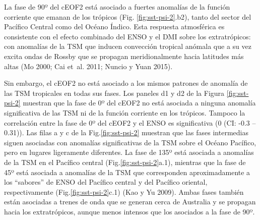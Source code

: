 \documentclass[12pt,oneside,a4paper]{reedthesis}
\begin{document}
La fase de 90º del cEOF2 está asociado a fuertes anomalías de la función corriente que emanan de los trópicos (Fig. \ref{fig:sst-psi-2}.b2), tanto del sector del Pacífico Central como del Océano Índico.
Esta respuesta atmosférica es consistente con el efecto combinado del ENSO y el DMI sobre los extratrópicos: con anomalías de la TSM que inducen convección tropical anómala que a su vez excita ondas de Rossby que se propagan meridionalmente hacia latitudes más altas (Mo 2000; Cai et~al. 2011; Nuncio y Yuan 2015).

Sin embargo, el cEOF2 no está asociado a los mismos patrones de anomalía de las TSM tropicales en todas sus fases.
Los paneles d1 y d2 de la Figura \ref{fig:sst-psi-2} muestran que la fase de 0º del cEOF2 no está asociada a ninguna anomalía significativa de las TSM ni de la función corriente en los trópicos.
Tampoco la correlación entre la fase de 0º del cEOF2 y el ENSO es significativa (0 (CI: -0.3 -- 0.31)).
Las filas a y c de la Fig.\ref{fig:sst-psi-2} muestran que las fases intermedias siguen asociadas con anomalías significativas de la TSM sobre el Océano Pacífico, pero en lugares ligeramente diferentes.
La fase de 135º está asociada a anomalías de la TSM en el Pacífico central (Fig.\ref{fig:sst-psi-2}a.1), mientras que la fase de 45º está asociada a anomalías de la TSM que corresponden aproximadamente a los ``sabores'' de ENSO del Pacífico central y del Pacífico oriental, respectivamente (Fig.\ref{fig:sst-psi-2}c.1) (Kao y Yu 2009).
Ambas fases también están asociadas a trenes de onda que se generan cerca de Australia y se propagan hacia los extratrópicos, aunque menos intensos que los asociados a la fase de 90º.
\end{document}

